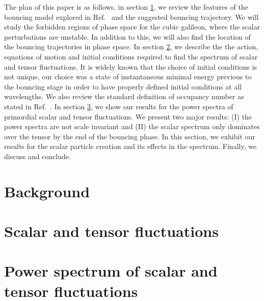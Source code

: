 \documentclass[aps,prd,reprint,twocolumn,showpacs,nofootinbib,superscriptaddress,floatfix]{revtex4-1}
\begin{document}
The plan of this paper is as follows, in section \ref{secII}, we review the features of the bouncing model explored in Ref.~\cite{Ijjas:2016tpn} and the suggested bouncing trajectory. We will study the forbidden regions of phase space for the cubic galileon, where the scalar perturbations are unstable. In addition to this, we will also find the location of the bouncing trajectories in phase space. In section \ref{secIII}, we describe the the action, equations of motion and initial conditions required to find the spectrum of scalar and tensor fluctuations. It is widely known that the choice of initial conditions is not unique, our choice was a state of instantaneous minimal energy previous to the bouncing stage in order to have properly defined initial conditions at all wavelengths. We also review the standard definition of occupancy number as stated in Ref.~\cite{Barnaby:2010ke}. In section \ref{secIV}, we show our results for the power spectra of primordial scalar and tensor fluctuations. We present two major results: (I) the power spectra are not scale invariant and (II) the scalar spectrum only dominates over the tensor by the end of the bouncing phase. In this section, we exhibit our results for the scalar particle creation and its effects in the spectrum. Finally, we discuss and conclude.      

\section{Background}\label{secII}
\section{Scalar and tensor fluctuations}\label{secIII}
\section{Power spectrum of scalar and tensor fluctuations}\label{secIV}
\end{document}
